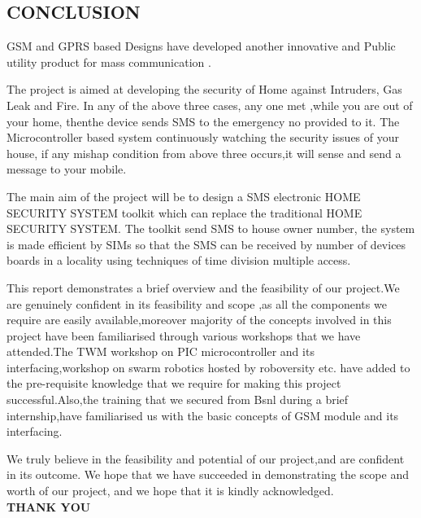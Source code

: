 \documentclass[12pt,a4paper,oneside]{report}
\begin{document}
\begin{onehalfspacing}
\newpage
\section{CONCLUSION}
\par
\hspace{.7cm}
 GSM and GPRS based Designs have developed another innovative and Public utility product for mass communication .

The project is aimed at developing the security of Home against Intruders, Gas Leak and Fire. 
In any of the above three cases, any one met ,while you are out of your home, thenthe device sends SMS to the emergency no provided to it. The Microcontroller based system continuously watching the security issues of your house, if any mishap condition from above three occurs,it will sense and send a message to your mobile.
					
The main aim of the project will be to design a SMS electronic HOME SECURITY SYSTEM toolkit which can replace the traditional HOME SECURITY SYSTEM. The toolkit send SMS to house owner number, the system is made efficient by SIMs so that the SMS can be received by number of devices boards in a locality using techniques of time division multiple access.

This report demonstrates a brief overview and the feasibility of our project.We are genuinely confident in its feasibility and scope ,as all the components we require are easily available,moreover majority of the concepts involved in this project have been familiarised  through various workshops that we have attended.The TWM workshop on PIC microcontroller and its interfacing,workshop on swarm robotics hosted by roboversity etc. have added to the pre-requisite knowledge that we require for making this project successful.Also,the training that we secured from Bsnl during a brief internship,have familiarised us with the basic concepts of GSM module and its interfacing.

We truly believe in the feasibility and potential of our project,and are confident in its outcome. We hope  that we have succeeded in demonstrating the scope and worth of our project, and we hope that it is kindly acknowledged.\\




\textbf{THANK YOU}
\centering




\end{onehalfspacing}
\end{document}
